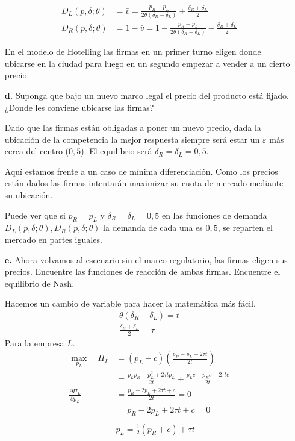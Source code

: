 \documentclass{exam}
\begin{document}
\begin{enumerate}
\begin{solution}
\begin{align*}
    D_L(p,\delta;\theta) &= \bar{v} = \frac{p_R-p_L}{2\theta (\delta_R-\delta_L)} + \frac{\delta_R + \delta_L}{2} \\
    D_R(p,\delta;\theta) &= 1 - \bar{v} = 1 -  \frac{p_R-p_L}{2\theta (\delta_R-\delta_L)} - \frac{\delta_R + \delta_L}{2} 
\end{align*}
    \end{solution}
    En el modelo de Hotelling las firmas en un primer turno eligen donde ubicarse en la ciudad para luego en un segundo empezar a vender a un cierto precio. 
    \item[\textbf{d.}] Suponga que bajo un nuevo marco legal el precio del producto está fijado. ¿Donde les conviene ubicarse las firmas?
    \begin{solution}
        Dado que las firmas están obligadas a poner un nuevo precio, dada la ubicación de la competencia la mejor respuesta siempre será estar un $\varepsilon$ más cerca del centro ($0,5$). El equilibrio será $\delta_R = \delta_L = 0,5$.

        Aquí estamos frente a un caso de mínima diferenciación. Como los precios están dados las firmas intentarán maximizar su cuota de mercado mediante su ubicación. 

        Puede ver que si $p_R = p_L $ y $\delta_R = \delta_L = 0,5$ en las funciones de demanda $D_L(p,\delta;\theta),D_R(p,\delta;\theta)$ la demanda de cada una es $0,5$, se reparten el mercado en partes iguales.
    \end{solution}
    \item[\textbf{e.}] Ahora volvamos al escenario sin el marco regulatorio, las firmas eligen sus precios. Encuentre las funciones de reacción de ambas firmas. Encuentre el equilibrio de Nash.
    \begin{solution}
        Hacemos un cambio de variable para hacer la matemática más fácil.
\begin{align*}
    \theta(\delta_R-\delta_L) = t \\
    \frac{\delta_R+\delta_L}{2} = \tau
\end{align*}
Para la empresa $L$.
\begin{align*}
    \max_{p_L} \quad \Pi_L &= (p_L - c) \left( 
 \frac{p_R-p_L+2\tau t}{2t}  \right) \\
    & = \frac{p_Lp_R - p_L^2 +2\tau tp_L}{2t} + \frac{p_Lc-p_Rc-2\tau t c}{2t} \\
    \frac{\partial \Pi_L}{\partial p_L} & = \frac{p_R-2p_L+2\tau t +c}{2t} = 0 \\
    & = p_R -2p_L+2\tau t +c = 0 \\
    & \quad \\
    & \boxed{p_L = \frac{1}{2} (p_R + c) + \tau t} 
\end{align*}


\end{solution}
\end{enumerate}
\end{document}
